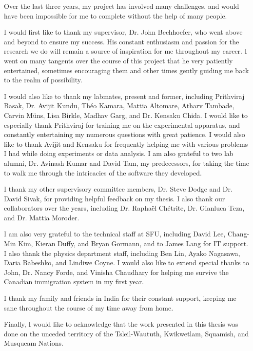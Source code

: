 \documentclass[hyperref={colorlinks=true, urlcolor=blue, citecolor=blue, final, bound}]{sfuthesis}
\begin{document}
\begin{acknowledgements}
    Over the last three years, my project has involved many challenges, and would have been impossible for me to complete without the help of many people. 

    I would first like to thank my supervisor, Dr. John Bechhoefer, who went above and beyond to ensure my success. His constant enthusiasm and passion for the research we do will remain a source of inspiration for me throughout my career. I went on many tangents over the course of this project that he very patiently entertained, sometimes encouraging them and other times gently guiding me back to the realm of possibility. 

    I would also like to thank my labmates, present and former, including Prithviraj Basak, Dr. Avijit Kundu, Th\'eo Kamara, Mattia Altomare, Atharv Tambade, Carvin M\"uns, Lisa Birkle, Madhav Garg, and Dr. Kensaku Chida. I would like to especially thank Prithviraj for training me on the experimental apparatus, and constantly entertaining my numerous questions with great patience. I would also like to thank Avijit and Kensaku for frequently helping me with various problems I had while doing experiments or data analysis. I am also grateful to two lab alumni, Dr. Avinash Kumar and David Tam, my predecessors, for taking the time to walk me through the intricacies of the software they developed.

    I thank my other supervisory committee members, Dr. Steve Dodge and Dr. David Sivak, for providing helpful feedback on my thesis. I also thank our collaborators over the years, including Dr. Rapha\"el Ch\'etrite, Dr. Gianluca Teza, and Dr. Mattia Moroder. 

    I am also very grateful to the technical staff at SFU, including David Lee, Chang-Min Kim, Kieran Duffy, and Bryan Gormann, and to James Lang for IT support. I also thank the physics department staff, including Ben Lin, Ayako Nagasawa, Daria Babeshko, and Lindiwe Coyne. I would also like to extend special thanks to John, Dr. Nancy Forde, and Vinisha Chaudhary for helping me survive the Canadian immigration system in my first year.

    I thank my family and friends in India for their constant support, keeping me sane throughout the course of my time away from home. 

    Finally, I would like to acknowledge that the work presented in this thesis was done on the unceded territory of the Tsleil-Waututh, Kwikwetlam, Squamish, and Musqueam Nations.
\end{acknowledgements} 
\end{document}
